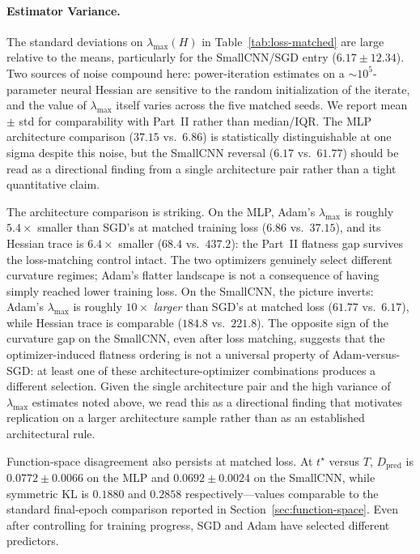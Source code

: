 \paragraph{Estimator Variance.}
The standard deviations on $\lambda_{\max}(H)$ in Table~\ref{tab:loss-matched} are large relative to the means, particularly for the SmallCNN/SGD entry ($6.17 \pm 12.34$). Two sources of noise compound here: power-iteration estimates on a $\sim 10^5$-parameter neural Hessian are sensitive to the random initialization of the iterate, and the value of $\lambda_{\max}$ itself varies across the five matched seeds. We report mean $\pm$ std for comparability with Part~II rather than median/IQR. The MLP architecture comparison ($37.15$ vs.\ $6.86$) is statistically distinguishable at one sigma despite this noise, but the SmallCNN reversal ($6.17$ vs.\ $61.77$) should be read as a directional finding from a single architecture pair rather than a tight quantitative claim.

The architecture comparison is striking. On the MLP, Adam's $\lambda_{\max}$ is roughly $5.4\times$ smaller than SGD's at matched training loss ($6.86$ vs.\ $37.15$), and its Hessian trace is $6.4\times$ smaller ($68.4$ vs.\ $437.2$): the Part~II flatness gap survives the loss-matching control intact. The two optimizers genuinely select different curvature regimes; Adam's flatter landscape is not a consequence of having simply reached lower training loss. On the SmallCNN, the picture inverts: Adam's $\lambda_{\max}$ is roughly $10\times$ \emph{larger} than SGD's at matched loss ($61.77$ vs.\ $6.17$), while Hessian trace is comparable ($184.8$ vs.\ $221.8$). The opposite sign of the curvature gap on the SmallCNN, even after loss matching, suggests that the optimizer-induced flatness ordering is not a universal property of Adam-versus-SGD: at least one of these architecture-optimizer combinations produces a different selection. Given the single architecture pair and the high variance of $\lambda_{\max}$ estimates noted above, we read this as a directional finding that motivates replication on a larger architecture sample rather than as an established architectural rule.

Function-space disagreement also persists at matched loss. At $t^\star$ versus $T$, $D_{\mathrm{pred}}$ is $0.0772 \pm 0.0066$ on the MLP and $0.0692 \pm 0.0024$ on the SmallCNN, while symmetric KL is $0.1880$ and $0.2858$ respectively---values comparable to the standard final-epoch comparison reported in Section~\ref{sec:function-space}. Even after controlling for training progress, SGD and Adam have selected different predictors.

